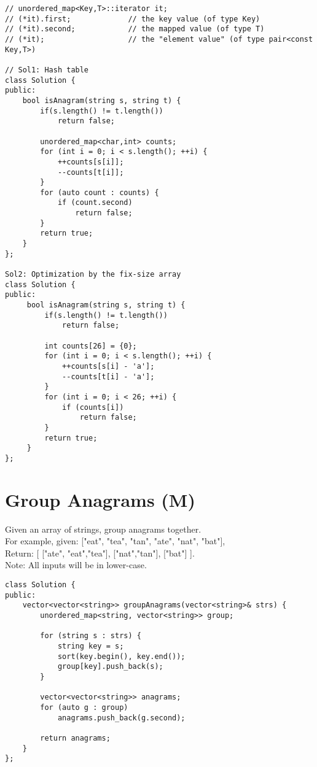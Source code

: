 \begin{lstlisting}
// unordered_map<Key,T>::iterator it;
// (*it).first;             // the key value (of type Key)
// (*it).second;            // the mapped value (of type T)
// (*it);                   // the "element value" (of type pair<const Key,T>)

// Sol1: Hash table
class Solution {
public:
    bool isAnagram(string s, string t) {
        if(s.length() != t.length())
            return false;
            
        unordered_map<char,int> counts;
        for (int i = 0; i < s.length(); ++i) {
            ++counts[s[i]];
            --counts[t[i]];
        }
        for (auto count : counts) {
            if (count.second)
                return false;
        }
        return true;
    }
};

Sol2: Optimization by the fix-size array
class Solution {
public:
     bool isAnagram(string s, string t) {
         if(s.length() != t.length())
             return false;
            
         int counts[26] = {0};
         for (int i = 0; i < s.length(); ++i) {
             ++counts[s[i] - 'a'];
             --counts[t[i] - 'a'];
         }
         for (int i = 0; i < 26; ++i) {
             if (counts[i])
                 return false;
         }
         return true;
     }
};
\end{lstlisting}


\section{Group Anagrams (M)}
Given an array of strings, group anagrams together.\\

For example, given: ["eat", "tea", "tan", "ate", "nat", "bat"],\\
Return:
[
  ["ate", "eat","tea"],
  ["nat","tan"],
  ["bat"]
].\\

Note: All inputs will be in lower-case.\\

\begin{lstlisting}
class Solution {
public:
    vector<vector<string>> groupAnagrams(vector<string>& strs) {
        unordered_map<string, vector<string>> group;

        for (string s : strs) {
            string key = s; 
            sort(key.begin(), key.end());
            group[key].push_back(s);
        }
        
        vector<vector<string>> anagrams;
        for (auto g : group)
            anagrams.push_back(g.second);
        
        return anagrams;
    }
};
\end{lstlisting}


